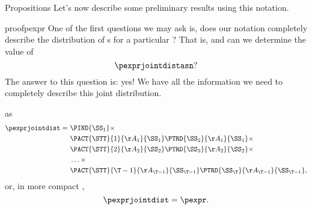 \begin{part}{Propositions}
  Let's now describe some preliminary results using this notation.

  \begin{refenv}{proof}{pexpr}
    One of the first questions we may ask is, does our notation completely describe
    the distribution of \run{}s for a particular \str?
    That is, 
    and
    can we determine the value of
    $$\pexprjointdistasn?$$
    The answer to this question is: yes! 
    We have all the information we need 
    to completely describe 
    this joint distribution. 

     as
    \begin{align*}
      \pexprjointdist
      =\ &\PIND{\SS_1}\times\\
         &\PACT{\STT}{1}{\AA_1}{\SS_1}
          \PTRD{\SS_2}{\AA_1}{\SS_1}\times\\
         &\PACT{\STT}{2}{\AA_2}{\SS_2}
          \PTRD{\SS_3}{\AA_2}{\SS_2}\times\\
         &\ldots\times\\
         &\PACT{\STT}{{\T - 1}}{\AA_{\T - 1}}{\SS_{\T - 1}}
          \PTRD{\SS_\T}{\AA_{\T - 1}}{\SS_{\T - 1}},
    \end{align*}
    or, in more compact ,
    $$\pexprjointdist = \pexpr.$$
  \end{refenv}
\end{part}
